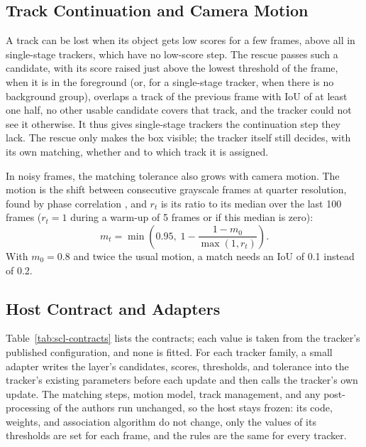 \subsection{Track Continuation and Camera Motion}\label{sec:scl-rescue}
A track can be lost when its object gets low scores for a few frames, above all in single-stage trackers, which have no low-score step. The rescue passes such a candidate, with its score raised just above the lowest threshold of the frame, when it is in the foreground (or, for a single-stage tracker, when there is no background group), overlaps a track of the previous frame with IoU of at least one half, no other usable candidate covers that track, and the tracker could not see it otherwise. It thus gives single-stage trackers the continuation step they lack. The rescue only makes the box visible; the tracker itself still decides, with its own matching, whether and to which track it is assigned.

In noisy frames, the matching tolerance also grows with camera motion. The motion is the shift between consecutive grayscale frames at quarter resolution, found by phase correlation \cite{reddy1996phasecorr}, and $r_t$ is its ratio to its median over the last 100 frames ($r_t=1$ during a warm-up of 5 frames or if this median is zero):
\begin{equation}
m_t=\min\!\left(0.95,\;1-\frac{1-m_0}{\max(1,r_t)}\right).
\label{eq:scl-motion}
\end{equation}
With $m_0=0.8$ and twice the usual motion, a match needs an IoU of 0.1 instead of 0.2.

\subsection{Host Contract and Adapters}\label{sec:scl-contract}
Table~\ref{tab:scl-contracts} lists the contracts; each value is taken from the tracker's published configuration, and none is fitted. For each tracker family, a small adapter writes the layer's candidates, scores, thresholds, and tolerance into the tracker's existing parameters before each update and then calls the tracker's own update. The matching steps, motion model, track management, and any post-processing of the authors run unchanged, so the host stays frozen: its code, weights, and association algorithm do not change, only the values of its thresholds are set for each frame, and the rules are the same for every tracker.

